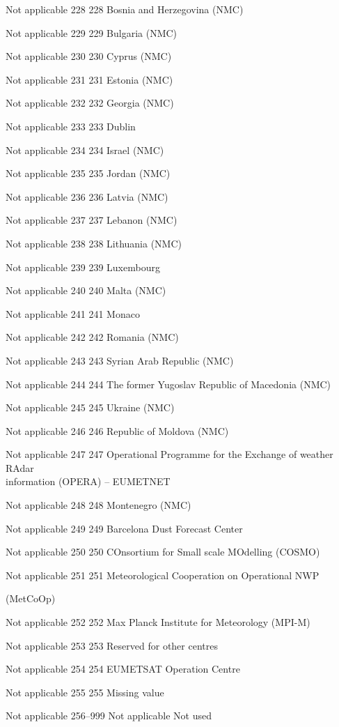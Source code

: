 Not applicable 228 228 Bosnia and Herzegovina (NMC)

Not applicable 229 229 Bulgaria (NMC)

Not applicable 230 230 Cyprus (NMC)

Not applicable 231 231 Estonia (NMC)

Not applicable 232 232 Georgia (NMC)

Not applicable 233 233 Dublin

Not applicable 234 234 Israel (NMC)

Not applicable 235 235 Jordan (NMC)

Not applicable 236 236 Latvia (NMC)

Not applicable 237 237 Lebanon (NMC)

Not applicable 238 238 Lithuania (NMC)

Not applicable 239 239 Luxembourg

Not applicable 240 240 Malta (NMC)

Not applicable 241 241 Monaco

Not applicable 242 242 Romania (NMC)

Not applicable 243 243 Syrian Arab Republic (NMC)

Not applicable 244 244 The former Yugoslav Republic of Macedonia (NMC)

Not applicable 245 245 Ukraine (NMC)

Not applicable 246 246 Republic of Moldova (NMC)

Not applicable 247 247 Operational Programme for the Exchange of weather RAdar\\
information (OPERA) -- EUMETNET

Not applicable 248 248 Montenegro (NMC)

Not applicable 249 249 Barcelona Dust Forecast Center

Not applicable 250 250 COnsortium for Small scale MOdelling (COSMO)

Not applicable 251 251 Meteorological Cooperation on Operational NWP

(MetCoOp)

Not applicable 252 252 Max Planck Institute for Meteorology (MPI-M)

Not applicable 253 253 Reserved for other centres

Not applicable 254 254 EUMETSAT Operation Centre

Not applicable 255 255 Missing value

Not applicable 256--999 Not applicable Not used

